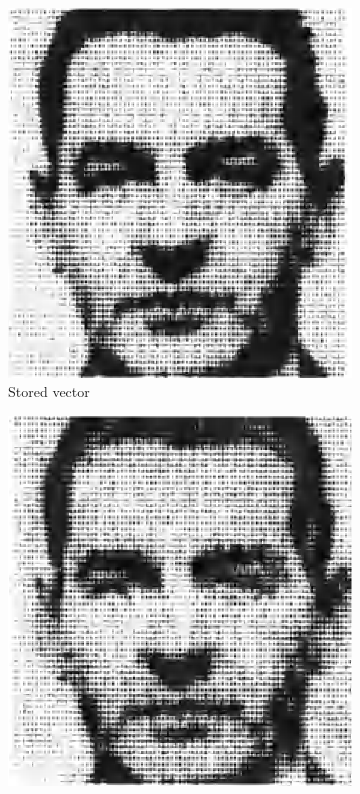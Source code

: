 \documentclass[runningheads]{llncs}
\begin{document}
\begin{figure}[htbp]
     \centering
     \begin{subfigure}[t]{0.3\textwidth}
         \centering
         \includegraphics[width=\textwidth]{img/kohonenA.png}
         \caption{Stored vector}
         \label{kohonen2A}
     \end{subfigure}
     \hfill
     \begin{subfigure}[t]{0.3\textwidth}
         \centering
         \includegraphics[width=\textwidth]{img/kohonenC.png}

\end{subfigure}
\end{figure}
\end{document}
